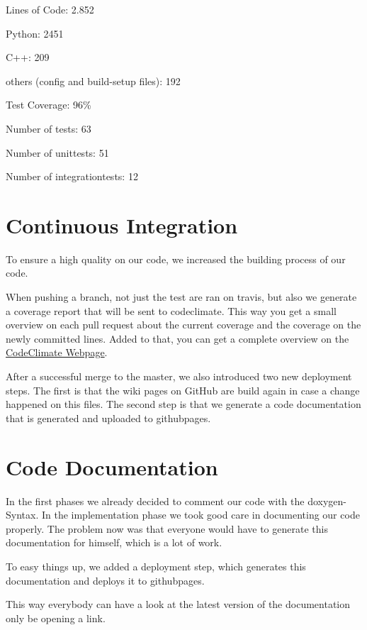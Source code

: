 \documentclass[parskip=full]{scrartcl}
\begin{document}
Lines of Code: 2.852

Python: 2451

C++: 209

others (config and build-setup files): 192

Test Coverage: 96\%

Number of tests: 63

Number of \glspl{unittest}: 51

Number of \glspl{integrationtest}: 12

\newpage

\section{Continuous Integration}

To ensure a high quality on our code, we increased the building process of our code.

When pushing a branch, not just the test are ran on \gls{travis}, but also we generate a coverage report that will be sent to \gls{codeclimate}.
This way you get a small overview on each pull request about the current coverage and the coverage on the newly committed lines.
Added to that, you can get a complete overview on the
\href{https://codeclimate.com/github/TheSlimvReal/PSE---LA-meets-ML}{CodeClimate Webpage}.

After a successful merge to the master, we also introduced two new deployment steps.
The first is that the wiki pages on GitHub are build again in case a change happened on this files.
The second step is that we generate a code documentation that is generated and uploaded to \gls{githubpages}.

\newpage



\section{Code Documentation}

In the first phases we already decided to comment our code with the \gls{doxygen}-Syntax.
In the implementation phase we took good care in documenting our code properly.
The problem now was that everyone would have to generate this documentation for himself, which is a lot of work.

To easy things up, we added a deployment step, which generates this documentation and deploys it to \gls{githubpages}.

This way everybody can have a look at the latest version of the documentation only be opening a link.
\end{document}
